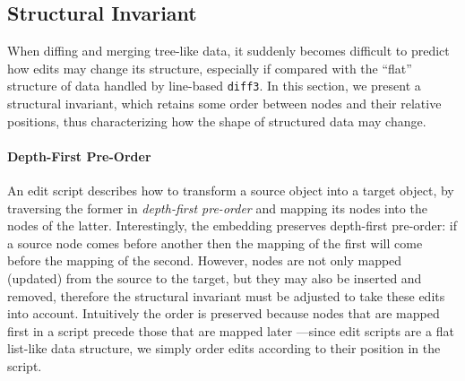 \documentclass{sigplanconf}
\theoremstyle{plain}
\begin{document}

   		
\subsection{Structural Invariant}
When diffing and merging tree-like data, it suddenly becomes difficult
to predict how edits may change its structure, especially if
compared with the ``flat'' structure of data handled by line-based
\texttt{diff3}.
%
In this section, we present a structural invariant, which retains some
order between nodes and their relative positions, thus characterizing
how the shape of structured data may change.
%    

\paragraph{Depth-First Pre-Order}
An edit script describes how to transform a source object into a
target object, by traversing the former in \emph{depth-first
  pre-order} and mapping its nodes into the nodes of the latter.
%
Interestingly, the embedding preserves depth-first pre-order: if a
source node comes before another then the mapping of the first will
come before the mapping of the second.
%
However, nodes are not only mapped (updated) from the source to the
target, but they may also be inserted and removed, therefore the
structural invariant must be adjusted to take these edits into
account.
%
Intuitively the order is preserved because nodes that are mapped first
in a script precede those that are mapped later ---since edit scripts
are a flat list-like data structure, we simply order edits according
to their position in the script.
    
\end{document}
